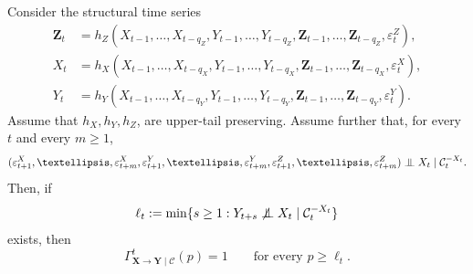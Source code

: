 \documentclass[a4paper,11pt]{article}
\newenvironment{customprop}[1]
  {\renewcommand\theinnercustomprop{#1}\innercustomprop}
  {\endinnercustomprop}
\newcommand{\indep}{\perp\kern-5.5pt\perp}
\begin{document}
\begin{customprop}{\ref{proposition_with_lag_2}}
Consider the structural time series
\[
\begin{split}
   \mathbf Z_t
   &= h_Z(X_{t-1},\ldots,X_{t-q_Z},
          Y_{t-1},\ldots,Y_{t-q_Z},
          \mathbf Z_{t-1},\ldots,\mathbf Z_{t-q_Z},
          \varepsilon^Z_t),\\
   X_t
   &= h_X(X_{t-1},\ldots,X_{t-q_X},
          Y_{t-1},\ldots,Y_{t-q_X},
          \mathbf Z_{t-1},\ldots,\mathbf Z_{t-q_X},
          \varepsilon^X_t),\\
   Y_t
   &= h_Y(X_{t-1},\ldots,X_{t-q_Y},
          Y_{t-1},\ldots,Y_{t-q_Y},
          \mathbf Z_{t-1},\ldots,\mathbf Z_{t-q_Y},
          \varepsilon^Y_t).
\end{split}
\]
Assume that \(h_X,h_Y,h_Z\), are upper-tail preserving. Assume further that,
for every \(t\) and every \(m\ge 1\),
\[
   (\varepsilon^X_{t+1},\ldots,\varepsilon^X_{t+m},
    \varepsilon^Y_{t+1},\ldots,\varepsilon^Y_{t+m},
    \varepsilon^Z_{t+1},\ldots,\varepsilon^Z_{t+m})
   \indep X_t \mid \mathcal C_t^{-X_t}.
\]
Then, if
\[
   \ell_t:=\min\{s\ge 1:
   Y_{t+s}\not\indep X_t\mid \mathcal C_t^{-X_t}\}
\]
exists, then
\[
   \Gamma_{\mathbf X\to \mathbf Y\mid\mathcal C}^t(p)=1
   \qquad\text{for every }p\ge \ell_t .
\]
\end{customprop}
\end{document}
